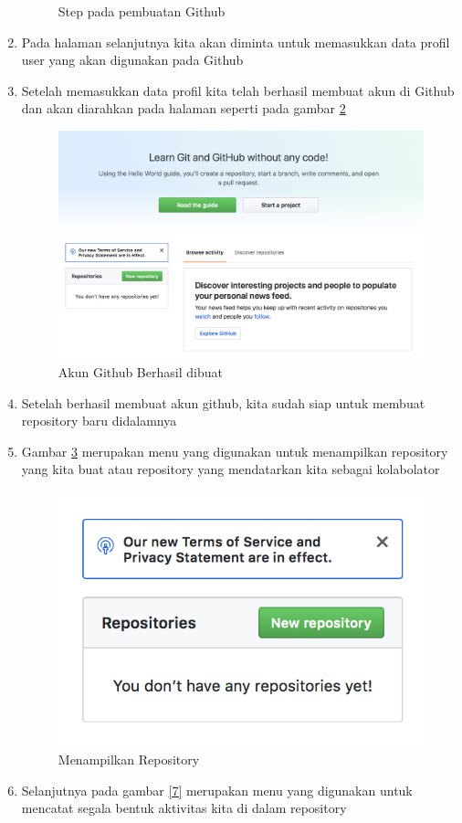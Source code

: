 \begin{enumerate}
\begin{figure}[!htbp]
\caption{Step pada pembuatan Github}
\label{4}
\end{figure}
\item Pada halaman selanjutnya kita akan diminta untuk memasukkan data profil user yang akan digunakan pada Github
\item Setelah memasukkan data profil kita telah berhasil membuat akun di Github dan akan diarahkan pada halaman seperti pada gambar \ref{5}
\begin{figure}[!htbp]
\centerline{\includegraphics[width=.75\textwidth]{Figures/akunGit/5.PNG}}
\caption{Akun Github Berhasil dibuat}
\label{5}
\end{figure} 
\item Setelah berhasil membuat akun github, kita sudah siap untuk membuat repository baru didalamnya
\item Gambar \ref{6} merupakan menu yang digunakan untuk menampilkan repository yang kita buat atau repository yang mendatarkan kita sebagai kolabolator
\begin{figure}[!htbp]
\centerline{\includegraphics[width=.75\textwidth]{Figures/akunGit/6.PNG}}
\caption{Menampilkan Repository}
\label{6}
\end{figure} 
\item Selanjutnya pada gambar \ref{7} merupakan menu yang digunakan untuk mencatat segala bentuk aktivitas kita di dalam repository

\end{enumerate}
